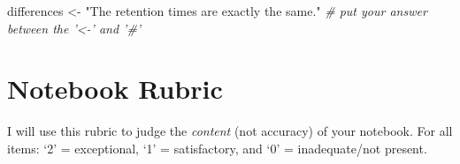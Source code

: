 \documentclass[]{tufte-book}
\newenvironment{Shaded}{}{}
\newcommand{\CommentTok}[1]{\textcolor[rgb]{0.38,0.63,0.69}{\textit{#1}}}
\newcommand{\NormalTok}[1]{#1}
\newcommand{\StringTok}[1]{\textcolor[rgb]{0.25,0.44,0.63}{#1}}
\begin{document}
\begin{Shaded}
\begin{Highlighting}[]
\NormalTok{differences <-}\StringTok{ "The retention times are exactly the same."}    \CommentTok{# put your answer between the '<-' and '#'}
\end{Highlighting}
\end{Shaded}

\hypertarget{gctcd-rubric}{%
\section{Notebook Rubric}\label{gctcd-rubric}}

I will use this rubric to judge the \emph{content} (not accuracy) of your notebook. For all items: `2' = exceptional, `1' = satisfactory, and `0' = inadequate/not present.
\end{document}
